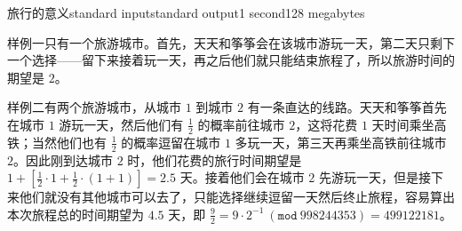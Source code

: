 \begin{problem}{旅行的意义}{standard input}{standard output}{1 second}{128 megabytes}
    
    \Example
    
    \begin{example}
    \end{example}

    \Explanation

    样例一只有一个旅游城市。首先，天天和筝筝会在该城市游玩一天，第二天只剩下一个选择——留下来接着玩一天，再之后他们就只能结束旅程了，所以旅游时间的期望是 $2$。

    样例二有两个旅游城市，从城市 $1$ 到城市 $2$ 有一条直达的线路。天天和筝筝首先在城市 $1$ 游玩一天，然后他们有 $\frac{1}{2}$ 的概率前往城市 $2$，这将花费 $1$ 天时间乘坐高铁；当然他们也有 $\frac{1}{2}$ 的概率逗留在城市 $1$ 多玩一天，第三天再乘坐高铁前往城市 $2$。因此刚到达城市 $2$ 时，他们花费的旅行时间期望是 $1+[\frac{1}{2}\cdot 1 + \frac{1}{2}\cdot (1+1)]=2.5$ 天。接着他们会在城市 $2$ 先游玩一天，但是接下来他们就没有其他城市可以去了，只能选择继续逗留一天然后终止旅程，容易算出本次旅程总的时间期望为 $4.5$ 天，即 $\frac{9}{2}=9\cdot 2^{-1}\ (\texttt{mod}\ 998244353) = 499122181$。
    
\end{problem}